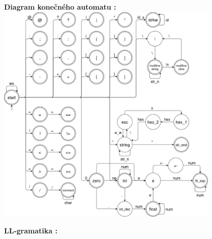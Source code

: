 \documentclass[12pt]{article}
\begin{document}
\newpage

\noindent \Large \textbf{Diagram konečného automatu :}
\newline \\

\includegraphics[width=0.8\textwidth,scale=0.5]{fsm}

\newpage

 \Large \textbf{LL-gramatika :} \\ \normalsize
\noindent\makebox[\linewidth]{\rule{\textwidth}{0.4pt}}
\end{document}
